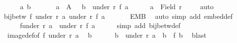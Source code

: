 \begin{isabellebody}
\ \ \ \ \isamarkupfalse%
\ a\ b{\isacharprime}{\kern0pt}\isanewline
\ \ \ \ \isamarkupfalse%
\ {\isacharasterisk}{\kern0pt}{\isacharcolon}{\kern0pt}\ {\isachardoublequoteopen}a\ {\isasymin}\ A{\isachardoublequoteclose}\ \ {\isacharasterisk}{\kern0pt}{\isacharasterisk}{\kern0pt}{\isacharcolon}{\kern0pt}\ {\isachardoublequoteopen}b{\isacharprime}{\kern0pt}\ {\isasymin}\ under\ r{\isacharprime}{\kern0pt}\ {\isacharparenleft}{\kern0pt}f\ a{\isacharparenright}{\kern0pt}{\isachardoublequoteclose}\isanewline
\ \ \ \ \isamarkupfalse%
\ {\isachardoublequoteopen}a\ {\isasymin}\ Field\ r{\isachardoublequoteclose}\ \isamarkupfalse%
\ {}\ \isamarkupfalse%
\ auto\isanewline
\ \ \ \ \isamarkupfalse%
\ {\isachardoublequoteopen}bij{\isacharunderscore}{\kern0pt}betw\ f\ {\isacharparenleft}{\kern0pt}under\ r\ a{\isacharparenright}{\kern0pt}\ {\isacharparenleft}{\kern0pt}under\ r{\isacharprime}{\kern0pt}\ {\isacharparenleft}{\kern0pt}f\ a{\isacharparenright}{\kern0pt}{\isacharparenright}{\kern0pt}{\isachardoublequoteclose}\isanewline
\ \ \ \ \isamarkupfalse%
\ {\isacharasterisk}{\kern0pt}\ EMB\ \isamarkupfalse%
\ {\isacharparenleft}{\kern0pt}auto\ simp\ add{\isacharcolon}{\kern0pt}\ embed{\isacharunderscore}{\kern0pt}def{\isacharparenright}{\kern0pt}\isanewline
\ \ \ \ \isamarkupfalse%
\ {\isachardoublequoteopen}f{\isacharbackquote}{\kern0pt}{\isacharparenleft}{\kern0pt}under\ r\ a{\isacharparenright}{\kern0pt}\ {\isacharequal}{\kern0pt}\ under\ r{\isacharprime}{\kern0pt}\ {\isacharparenleft}{\kern0pt}f\ a{\isacharparenright}{\kern0pt}{\isachardoublequoteclose}\isanewline
\ \ \ \ \isamarkupfalse%
\ {\isacharparenleft}{\kern0pt}simp\ add{\isacharcolon}{\kern0pt}\ bij{\isacharunderscore}{\kern0pt}betw{\isacharunderscore}{\kern0pt}def{\isacharparenright}{\kern0pt}\isanewline
\ \ \ \ \isamarkupfalse%
\ {\isacharasterisk}{\kern0pt}{\isacharasterisk}{\kern0pt}\ image{\isacharunderscore}{\kern0pt}def{\isacharbrackleft}{\kern0pt}of\ f\ {\isachardoublequoteopen}under\ r\ a{\isachardoublequoteclose}{\isacharbrackright}{\kern0pt}\ \isamarkupfalse%
\ b\ \isanewline
\ \ \ \ {}{\isacharcolon}{\kern0pt}\ {\isachardoublequoteopen}b\ {\isasymin}\ under\ r\ a\ {\isasymand}\ b{\isacharprime}{\kern0pt}\ {\isacharequal}{\kern0pt}\ f\ b{\isachardoublequoteclose}\ \isamarkupfalse%
\ blast\isanewline
\ \ \ \ \isamarkupfalse%

\end{isabellebody}

